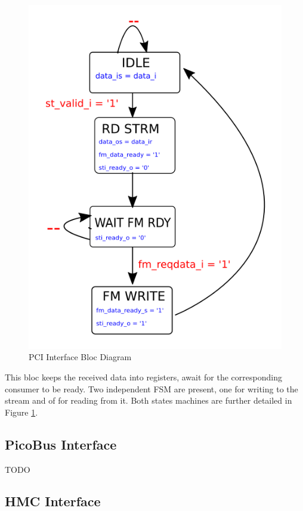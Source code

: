 \begin{minipage}[t]{0.45\textwidth}
\begin{figure}[H]
    \centering
    \includegraphics[scale = 0.4]{Figures/PCI_INTFCE_FSM.png}
    \caption{PCI Interface Bloc Diagram}
    \label{fig:pci_fsm}
\end{figure}
\end{minipage}
\hfill
\begin{minipage}[t]{0.3\textwidth}
This bloc keeps the received data into registers, await for the corresponding consumer to be ready. Two independent FSM are present, one for writing to the stream and of for reading from it. Both states machines are further detailed in Figure \ref{fig:pci_fsm}.
\end{minipage}


\subsection{PicoBus Interface}
TODO
\subsection{HMC Interface}

